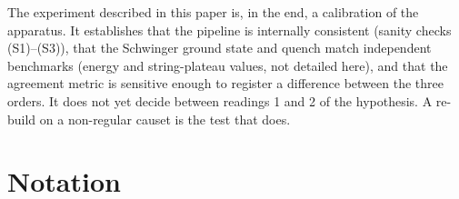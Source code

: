 \documentclass[11pt,a4paper]{article}
\theoremstyle{definition}
\theoremstyle{plain}
\theoremstyle{remark}
\begin{document}
The experiment described in this paper is, in the end, a calibration
of the apparatus.  It establishes that the pipeline is internally
consistent (sanity checks (S1)--(S3)), that the Schwinger ground
state and quench match independent benchmarks (energy and
string-plateau values, not detailed here), and that the agreement
metric is sensitive enough to register a difference between the
three orders.  It does not yet decide between readings 1 and 2 of
the hypothesis.  A re-build on a non-regular causet is the test
that does.

\appendix
\section{Notation}\label{app:notation}
\end{document}
